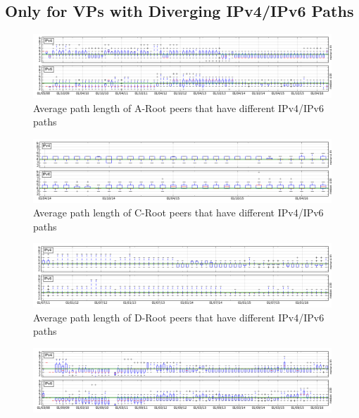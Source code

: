 \begin{appendices}
	\clearpage		
	\section{Only for VPs with Diverging IPv4/IPv6 Paths}
	\label{app:path-avg:diff-paths}
		\begin{figure}[!htb]
			\centering
			\includegraphics[width=6.0in]{img/path_avg_diff_a.png}
			\caption{Average path length of A-Root peers that have different IPv4/IPv6 paths}
			\label{fig:path-avg-diff-a}
		\end{figure}
		\begin{figure}[!htb]
			\centering
			\includegraphics[width=6.0in]{img/path_avg_diff_c.png}
			\caption{Average path length of C-Root peers that have different IPv4/IPv6 paths}
			\label{fig:path-avg-diff-c}
		\end{figure}
		\begin{figure}[!htb]
			\centering
			\includegraphics[width=6.0in]{img/path_avg_diff_d.png}
			\caption{Average path length of D-Root peers that have different IPv4/IPv6 paths}
			\label{fig:path-avg-diff-d}
		\end{figure}
		\begin{figure}[!htb]
			\centering
			\includegraphics[width=6.0in]{img/path_avg_diff_f.png}

\end{figure}
\end{appendices}
